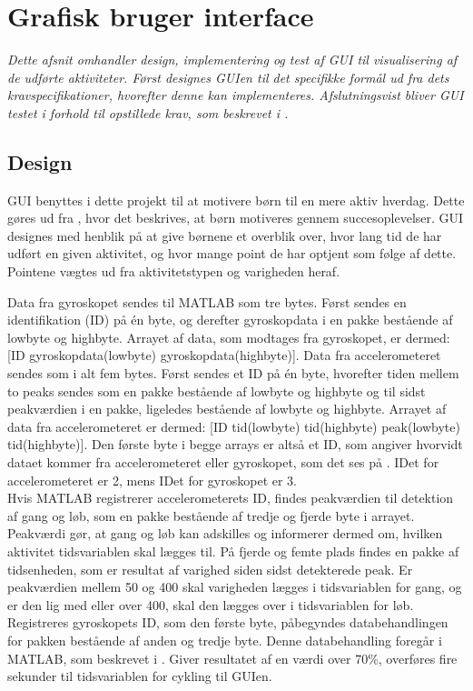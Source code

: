\section{Grafisk bruger interface}\label{GUI_design}
\textit{Dette afsnit omhandler design, implementering og test af GUI til visualisering af de udførte aktiviteter. Først designes GUIen til det specifikke formål ud fra dets kravspecifikationer, hvorefter denne kan implementeres. Afslutningsvist bliver GUI testet i forhold til opstillede krav, som beskrevet i .}

\subsection{Design}
GUI benyttes i dette projekt til at motivere børn til en mere aktiv hverdag. Dette gøres ud fra , hvor det beskrives, at børn motiveres gennem succesoplevelser. GUI designes med henblik på at give børnene et overblik over, hvor lang tid de har udført en given aktivitet, og hvor mange point de har optjent som følge af dette. Pointene vægtes ud fra aktivitetstypen og varigheden heraf. 

Data fra gyroskopet sendes til MATLAB som tre bytes. Først sendes en identifikation (ID) på én byte, og derefter gyroskopdata i en pakke bestående af lowbyte og highbyte. Arrayet af data, som modtages fra gyroskopet, er dermed: [ID gyroskopdata(lowbyte) gyroskopdata(highbyte)]. Data fra accelerometeret sendes som i alt fem bytes. Først sendes et ID på én byte, hvorefter tiden mellem to peaks sendes som en pakke bestående af lowbyte og highbyte og til sidst peakværdien i en pakke, ligeledes bestående af lowbyte og highbyte. Arrayet af data fra accelerometeret er dermed: [ID tid(lowbyte) tid(highbyte) peak(lowbyte) tid(highbyte)]. Den første byte i begge arrays er altså et ID, som angiver hvorvidt dataet kommer fra accelerometeret eller gyroskopet, som det ses på . IDet for accelerometeret er 2, mens IDet for gyroskopet er 3.\\
Hvis MATLAB registrerer accelerometerets ID, findes peakværdien til detektion af gang og løb, som en pakke bestående af tredje og fjerde byte i arrayet. Peakværdi gør, at gang og løb kan adskilles og informerer dermed om, hvilken aktivitet tidsvariablen skal lægges til. På fjerde og femte plads findes en pakke af tidsenheden, som er resultat af varighed siden sidst detekterede peak. Er peakværdien mellem 50 og 400 skal varigheden lægges i tidsvariablen for gang, og er den lig med eller over 400, skal den lægges over i tidsvariablen for løb.\\
Registreres gyroskopets ID, som den første byte, påbegyndes databehandlingen for pakken bestående af anden og tredje byte. Denne databehandling foregår i MATLAB, som beskrevet i . Giver resultatet af en værdi over 70\%, overføres fire sekunder til tidsvariablen for cykling til GUIen.\\ 

